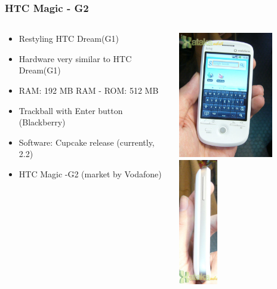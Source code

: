 \documentclass{beamer}
\begin{document}
\begin{frame}
\frametitle{HTC Magic - G2}

\begin{columns}
\begin{column}{0.5\textwidth}

\begin{itemize}
\item Restyling HTC Dream(G1)

\item Hardware very similar to HTC Dream(G1)
\item RAM: 192 MB RAM - ROM: 512 MB
\item Trackball with Enter button (Blackberry)
\item Software: Cupcake release (currently, 2.2)
\item HTC Magic -G2 (market by Vodafone)
\end{itemize}
\end{column}

\begin{column}{0.5\textwidth}
\begin{center}
  \includegraphics[height=5.5cm]{figs/htc-magic}
  \includegraphics[height=5.5cm]{figs/htc-magic-2}
\end{center}
\end{column}
\end{columns}
\end{frame}
\end{document}
